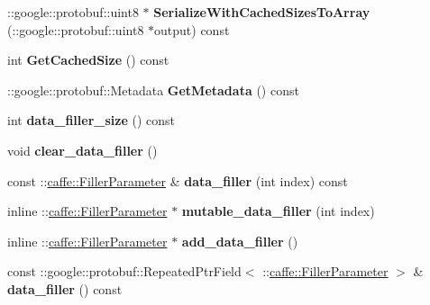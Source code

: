 \begin{DoxyCompactItemize}
\+::google\+::protobuf\+::uint8 $\ast$ {\bfseries Serialize\+With\+Cached\+Sizes\+To\+Array} (\+::google\+::protobuf\+::uint8 $\ast$output) const
\item 
\mbox{\label{classcaffe_1_1_dummy_data_parameter_a6a6a9ce8f36450898e7ad16e342db6e2}} 
int {\bfseries Get\+Cached\+Size} () const
\item 
\mbox{\label{classcaffe_1_1_dummy_data_parameter_aa4cd03b1c1cb492c1215435d05dc2d5b}} 
\+::google\+::protobuf\+::\+Metadata {\bfseries Get\+Metadata} () const
\item 
\mbox{\label{classcaffe_1_1_dummy_data_parameter_ac04580d29b2bec667dd06c3809708bd6}} 
int {\bfseries data\+\_\+filler\+\_\+size} () const
\item 
\mbox{\label{classcaffe_1_1_dummy_data_parameter_a69241a92147d63f7294a72c50f3a65b1}} 
void {\bfseries clear\+\_\+data\+\_\+filler} ()
\item 
\mbox{\label{classcaffe_1_1_dummy_data_parameter_a57bb18e48ac3df8efd8e22c728603488}} 
const \+::\mbox{\hyperlink{classcaffe_1_1_filler_parameter}{caffe\+::\+Filler\+Parameter}} \& {\bfseries data\+\_\+filler} (int index) const
\item 
\mbox{\label{classcaffe_1_1_dummy_data_parameter_a8cbf20c3de2eb267638edc172ea024df}} 
inline \+::\mbox{\hyperlink{classcaffe_1_1_filler_parameter}{caffe\+::\+Filler\+Parameter}} $\ast$ {\bfseries mutable\+\_\+data\+\_\+filler} (int index)
\item 
\mbox{\label{classcaffe_1_1_dummy_data_parameter_aa7cfb8e68dcea4154a462a48b5f661f1}} 
inline \+::\mbox{\hyperlink{classcaffe_1_1_filler_parameter}{caffe\+::\+Filler\+Parameter}} $\ast$ {\bfseries add\+\_\+data\+\_\+filler} ()
\item 
\mbox{\label{classcaffe_1_1_dummy_data_parameter_a802745264d863d5cda2f429046c15901}} 
const \+::google\+::protobuf\+::\+Repeated\+Ptr\+Field$<$ \+::\mbox{\hyperlink{classcaffe_1_1_filler_parameter}{caffe\+::\+Filler\+Parameter}} $>$ \& {\bfseries data\+\_\+filler} () const

\end{DoxyCompactItemize}
